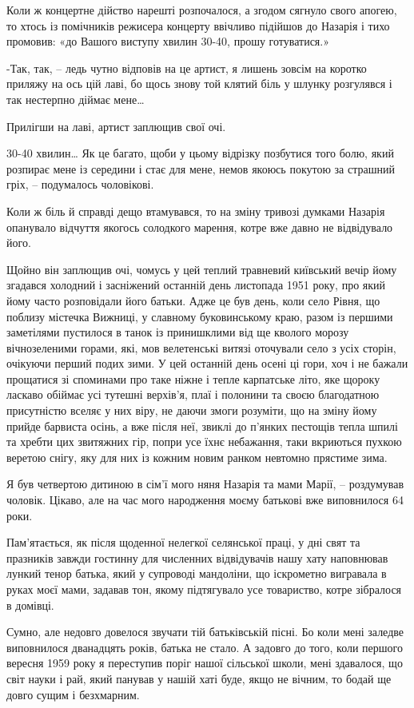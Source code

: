Коли ж концертне дійство нарешті розпочалося, а згодом сягнуло свого апогею, то
хтось із помічників режисера концерту ввічливо підійшов до Назарія і тихо
промовив: «до Вашого виступу хвилин 30-40, прошу готуватися.»

-Так, так, – ледь чутно відповів на це артист, я лишень зовсім на коротко
приляжу на ось цій лаві, бо щось знову той клятий біль у шлунку розгулявся і
так нестерпно діймає мене…

Прилігши на лаві, артист заплющив свої очі. 

30-40 хвилин… Як це багато, щоби у цьому відрізку позбутися того болю, який
розпирає мене із середини і стає для мене, немов якоюсь покутою за страшний
гріх, – подумалось чоловікові.

Коли ж біль й справді дещо втамувався, то на зміну тривозі думками Назарія
опанувало відчуття якогось солодкого марення, котре вже давно не відвідувало
його. 

Щойно він заплющив очі, чомусь у цей теплий травневий київський вечір йому
згадався холодний і засніжений останній день листопада 1951 року, про який йому
часто розповідали його батьки. Адже це був день, коли село Рівня, що поблизу
містечка Вижниці, у славному буковинському краю, разом із першими заметілями
пустилося в танок із принишклими від ще кволого морозу вічнозеленими горами,
які, мов велетенські витязі оточували село з усіх сторін, очікуючи перший подих
зими. У цей останній день осені ці гори, хоч і не бажали прощатися зі споминами
про таке ніжне і тепле карпатське літо, яке щороку ласкаво обіймає усі тутешні
верхів’я, плаї і полонини та своєю благодатною присутністю вселяє у них віру,
не даючи змоги розуміти, що на зміну йому прийде барвиста осінь, а вже після
неї, звиклі до п’янких пестощів тепла шпилі та хребти цих звитяжних гір, попри
усе їхнє небажання, таки вкриються пухкою веретою снігу, яку для них із кожним
новим ранком невтомно прястиме зима.

Я був четвертою дитиною в сім’ї мого няня Назарія та мами Марії, – роздумував
чоловік. Цікаво, але на час мого народження моєму батькові вже виповнилося 64
роки. 

Пам’ятається, як після щоденної нелегкої селянської праці, у дні свят та
празників завжди гостинну для численних відвідувачів нашу хату наповнював
лункий тенор батька, який у супроводі мандоліни, що іскрометно вигравала в
руках моєї мами, задавав тон, якому підтягувало усе товариство, котре зібралося
в домівці.  

Сумно, але недовго довелося звучати тій батьківській пісні. Бо коли мені
заледве виповнилося дванадцять років, батька не стало. А задовго до того, коли
першого вересня 1959 року я переступив поріг нашої сільської школи, мені
здавалося, що світ науки і рай, який панував у нашій хаті буде, якщо не вічним,
то бодай ще довго сущим і безхмарним. 

